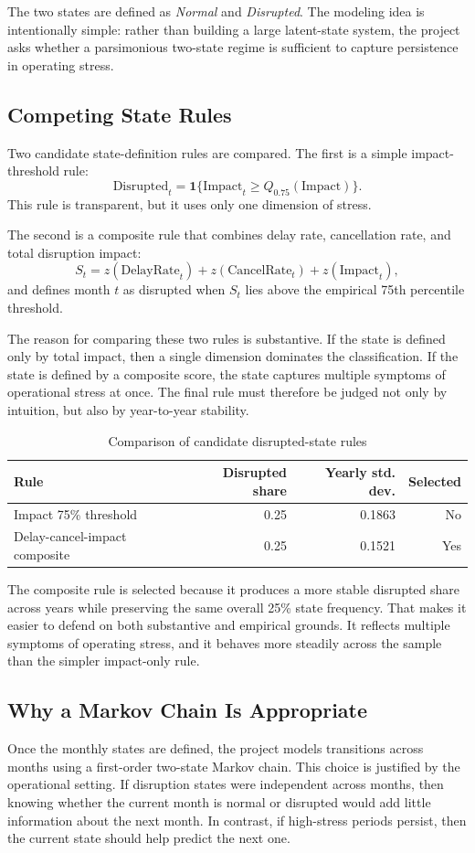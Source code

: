 \documentclass[11pt]{article}
\begin{document}
The two states are defined as \textit{Normal} and \textit{Disrupted}. The modeling idea is intentionally simple: rather than building a large latent-state system, the project asks whether a parsimonious two-state regime is sufficient to capture persistence in operating stress.

\subsection{Competing State Rules}
Two candidate state-definition rules are compared. The first is a simple impact-threshold rule:
\[
\text{Disrupted}_t = \mathbf{1}\{ \text{Impact}_t \ge Q_{0.75}(\text{Impact}) \}.
\]
This rule is transparent, but it uses only one dimension of stress.

The second is a composite rule that combines delay rate, cancellation rate, and total disruption impact:
\[
S_t = z(\text{DelayRate}_t) + z(\text{CancelRate}_t) + z(\text{Impact}_t),
\]
and defines month \(t\) as disrupted when \(S_t\) lies above the empirical 75th percentile threshold.

The reason for comparing these two rules is substantive. If the state is defined only by total impact, then a single dimension dominates the classification. If the state is defined by a composite score, the state captures multiple symptoms of operational stress at once. The final rule must therefore be judged not only by intuition, but also by year-to-year stability.

\begin{table}[H]
\centering
\caption{Comparison of candidate disrupted-state rules}
\begin{tabular}{lrrr}
\toprule
Rule & Disrupted share & Yearly std. dev. & Selected \\
\midrule
Impact 75\% threshold & 0.25 & 0.1863 & No \\
Delay-cancel-impact composite & 0.25 & 0.1521 & Yes \\
\bottomrule
\end{tabular}
\end{table}

The composite rule is selected because it produces a more stable disrupted share across years while preserving the same overall 25\% state frequency. That makes it easier to defend on both substantive and empirical grounds. It reflects multiple symptoms of operating stress, and it behaves more steadily across the sample than the simpler impact-only rule.

\subsection{Why a Markov Chain Is Appropriate}
Once the monthly states are defined, the project models transitions across months using a first-order two-state Markov chain. This choice is justified by the operational setting. If disruption states were independent across months, then knowing whether the current month is normal or disrupted would add little information about the next month. In contrast, if high-stress periods persist, then the current state should help predict the next one.
\end{document}
